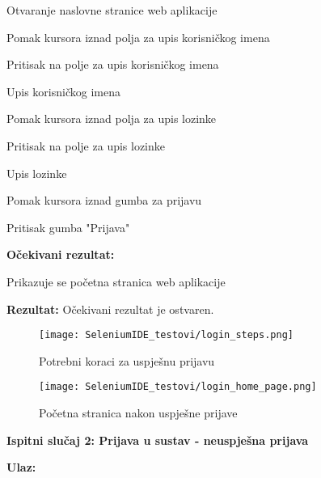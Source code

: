 					\begin{packed_enum}
					
						\item Otvaranje naslovne stranice web aplikacije
						\item Pomak kursora iznad polja za upis korisničkog imena
						\item Pritisak na polje za upis korisničkog imena
						\item Upis korisničkog imena
						\item Pomak kursora iznad polja za upis lozinke
						\item Pritisak na polje za upis lozinke
						\item Upis lozinke
						\item Pomak kursora iznad gumba za prijavu
						\item Pritisak gumba "Prijava"
						
					\end{packed_enum}
				
				\noindent\textbf{Očekivani rezultat:}
				
					\begin{packed_enum}
					
						\item Prikazuje se početna stranica web aplikacije
						
					\end{packed_enum}
				
				\noindent\textbf{Rezultat:} Očekivani rezultat je ostvaren.
				
				\begin{figure}[H]
					\texttt{[image: SeleniumIDE\_testovi/login\_steps.png]}
					\centering
					\caption{Potrebni koraci za uspješnu prijavu}
					\label{fig:login_steps}
				\end{figure}
				
				\begin{figure}[H]
					\texttt{[image: SeleniumIDE\_testovi/login\_home\_page.png]}
					\centering
					\caption{Početna stranica nakon uspješne prijave}
					\label{fig:login_home_page}
				\end{figure}

\noindent\textbf{Ispitni slučaj 2: Prijava u sustav - neuspješna prijava}
				
				\noindent\textbf{Ulaz:}
				
